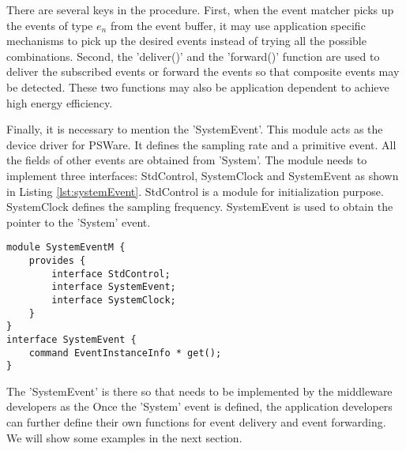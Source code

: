 There are several keys in the procedure. First, when the event matcher picks up the events of type \(e_n\) from the event buffer, it may use application specific mechanisms to pick up the desired events instead of trying all the possible combinations. Second, the 'deliver()' and the 'forward()' function are used to deliver the subscribed events or forward the events so that composite events may be detected. These two functions may also be application dependent to achieve high energy efficiency.

\begin{comment}
Figure \ref{fig:psware-interaction-simple} illustrates how different components in the middleware system interact with each other.

\begin{figure}
\centering
\figurecurrentwidth{psware-interaction-simple}
\caption{PSWare-E components interaction}
\label{fig:psware-interaction-simple}
\end{figure}
\subsection{PSWare Customization}
\end{comment}

Finally, it is necessary to mention the 'SystemEvent'. This module acts as the device driver for PSWare. It defines the sampling rate and a primitive event. All the fields of other events are obtained from 'System'. The module needs to implement three interfaces: StdControl, SystemClock and SystemEvent as shown in Listing \ref{lst:systemEvent}. StdControl is a module for initialization purpose. SystemClock defines the sampling frequency. SystemEvent is used to obtain the pointer to the 'System' event.

\begin{lstlisting}[caption=API of the 'System' event, label=lst:systemEvent]
module SystemEventM {
	provides {
		interface StdControl;
		interface SystemEvent;
		interface SystemClock;
	}
}
interface SystemEvent {
	command EventInstanceInfo * get();
}
\end{lstlisting}

The 'SystemEvent' is there so that needs to be implemented by the middleware developers as the  Once the 'System' event is defined, the application developers can further define their own functions for event delivery and event forwarding. We will show some examples in the next section.

